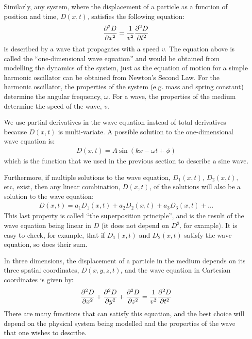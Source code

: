 Similarly, any system, where the displacement of a particle as a function of position and time, $D(x,t)$, satisfies the following equation:
\begin{align}
\frac{\partial ^2D}{\partial x^2}=\frac{1}{v^2}\frac{\partial ^2D}{\partial t^2}
\end{align}
is described by a wave that propagates with a speed $v$. The equation above is called the ``one-dimensional wave equation'' and would be obtained from modelling the dynamics of the system, just as the equation of motion for a simple harmonic oscillator can be obtained from Newton's Second Law. For the harmonic oscillator, the properties of the system (e.g. mass and spring constant) determine the angular frequency, $\omega$. For a wave, the properties of the medium determine the speed of the wave, $v$. 

We use partial derivatives in the wave equation instead of total derivatives because $D(x,t)$ is multi-variate. A possible solution to the one-dimensional wave equation is:
\begin{align*}
D(x,t) = A\sin\left( kx -\omega t + \phi \right)
\end{align*}
which is the function that we used in the previous section to describe a sine wave.

Furthermore, if multiple solutions to the wave equation, $D_1(x,t)$, $D_2(x,t)$, etc, exist, then any linear combination, $D(x,t)$, of the solutions will also be a solution to the wave equation:
\begin{align*}
D(x,t) = a_1D_1(x,t)+a_2D_2(x,t)+a_3D_3(x,t)+\dots
\end{align*}
This last property is called ``the superposition principle'', and is the result of the wave equation being linear in $D$ (it does not depend on $D^2$, for example). It is easy to check, for example, that if $D_1(x,t)$ and $D_2(x,t)$ satisfy the wave equation, so does their sum. 

In three dimensions, the displacement of a particle in the medium depends on its three spatial coordinates, $D(x,y,z,t)$, and the wave equation in Cartesian coordinates is given by:
\begin{align*}
\frac{\partial ^2D}{\partial x^2}+\frac{\partial ^2D}{\partial y^2}+\frac{\partial ^2D}{\partial z^2}&=\frac{1}{v^2}\frac{\partial ^2D}{\partial t^2}\\
\end{align*}
There are many functions that can satisfy this equation, and the best choice will depend on the physical system being modelled and the properties of the wave that one wishes to describe. 

